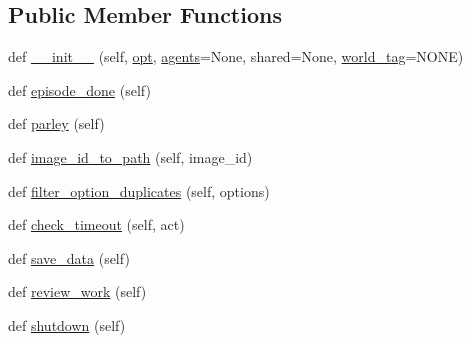 \subsection*{Public Member Functions}
\begin{DoxyCompactItemize}
\item 
def \hyperlink{classigc__evals_1_1worlds_1_1MTurkIGCEvalWorld_a917456c1cd24f8472e602699eb52413b}{\+\_\+\+\_\+init\+\_\+\+\_\+} (self, \hyperlink{classparlai_1_1core_1_1worlds_1_1World_a3640d92718acd3e6942a28c1ab3678bd}{opt}, \hyperlink{classigc__evals_1_1worlds_1_1MTurkIGCEvalWorld_af9ffc523ad51ee58a30f5b9ddee453be}{agents}=None, shared=None, \hyperlink{classigc__evals_1_1worlds_1_1MTurkIGCEvalWorld_a71ee5ba95de2b115ad926db20bf88ae4}{world\+\_\+tag}=\textquotesingle{}N\+O\+NE\textquotesingle{})
\item 
def \hyperlink{classigc__evals_1_1worlds_1_1MTurkIGCEvalWorld_a8c3a8c5efdefb5a5475f3290358c2e86}{episode\+\_\+done} (self)
\item 
def \hyperlink{classigc__evals_1_1worlds_1_1MTurkIGCEvalWorld_ab2ddf25bf050e7f12d675dc910c04a3d}{parley} (self)
\item 
def \hyperlink{classigc__evals_1_1worlds_1_1MTurkIGCEvalWorld_af15ae6901cfd80ff6b3253294f0f46c6}{image\+\_\+id\+\_\+to\+\_\+path} (self, image\+\_\+id)
\item 
def \hyperlink{classigc__evals_1_1worlds_1_1MTurkIGCEvalWorld_a93a8b179951ffcfac7c07da5da696e39}{filter\+\_\+option\+\_\+duplicates} (self, options)
\item 
def \hyperlink{classigc__evals_1_1worlds_1_1MTurkIGCEvalWorld_a75c18798b76fb6e3a7b5b74b31de3d55}{check\+\_\+timeout} (self, act)
\item 
def \hyperlink{classigc__evals_1_1worlds_1_1MTurkIGCEvalWorld_a63d2d41442d28373315a58c1d70686b3}{save\+\_\+data} (self)
\item 
def \hyperlink{classigc__evals_1_1worlds_1_1MTurkIGCEvalWorld_aa3a8ea3999f002288078223aa079d76d}{review\+\_\+work} (self)
\item 
def \hyperlink{classigc__evals_1_1worlds_1_1MTurkIGCEvalWorld_a8598b24c39425e921c38ef45fb1f7e95}{shutdown} (self)
\end{DoxyCompactItemize}
